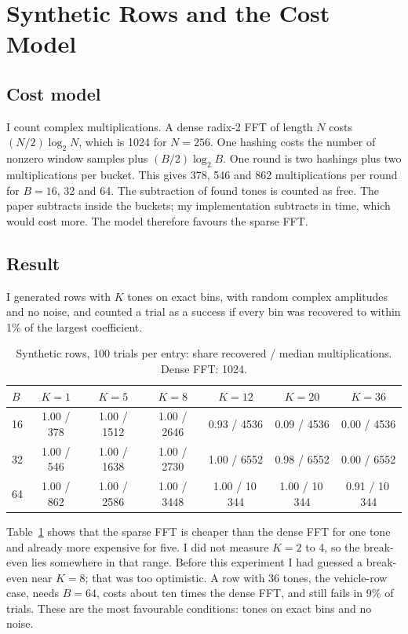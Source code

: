 \documentclass[10pt,a4paper]{article}
\begin{document}
\section{Synthetic Rows and the Cost Model}
\subsection{Cost model}
I count complex multiplications. A dense radix-2 FFT of length $N$ costs $(N/2)\log_2 N$, which is 1024 for $N = 256$. One hashing costs the number of nonzero window samples plus $(B/2)\log_2 B$. One round is two hashings plus two multiplications per bucket. This gives 378, 546 and 862 multiplications per round for $B = 16$, 32 and 64. The subtraction of found tones is counted as free. The paper subtracts inside the buckets; my implementation subtracts in time, which would cost more. The model therefore favours the sparse FFT.

\subsection{Result}
I generated rows with $K$ tones on exact bins, with random complex amplitudes and no noise, and counted a trial as a success if every bin was recovered to within 1\% of the largest coefficient.

\begin{table}[h]
\caption{Synthetic rows, 100 trials per entry: share recovered / median multiplications. Dense FFT: 1024.}
\label{tab:syn}
\centering
\begin{tabular}{lcccccc}
\toprule
$B$ & $K = 1$ & $K = 5$ & $K = 8$ & $K = 12$ & $K = 20$ & $K = 36$ \\
\midrule
16 & 1.00 / 378 & 1.00 / 1512 & 1.00 / 2646 & 0.93 / 4536 & 0.09 / 4536 & 0.00 / 4536 \\
32 & 1.00 / 546 & 1.00 / 1638 & 1.00 / 2730 & 1.00 / 6552 & 0.98 / 6552 & 0.00 / 6552 \\
64 & 1.00 / 862 & 1.00 / 2586 & 1.00 / 3448 & 1.00 / 10\,344 & 1.00 / 10\,344 & 0.91 / 10\,344 \\
\bottomrule
\end{tabular}
\end{table}

Table~\ref{tab:syn} shows that the sparse FFT is cheaper than the dense FFT for one tone and already more expensive for five. I did not measure $K = 2$ to 4, so the break-even lies somewhere in that range. Before this experiment I had guessed a break-even near $K = 8$; that was too optimistic. A row with 36 tones, the vehicle-row case, needs $B = 64$, costs about ten times the dense FFT, and still fails in 9\% of trials. These are the most favourable conditions: tones on exact bins and no noise.
\end{document}
